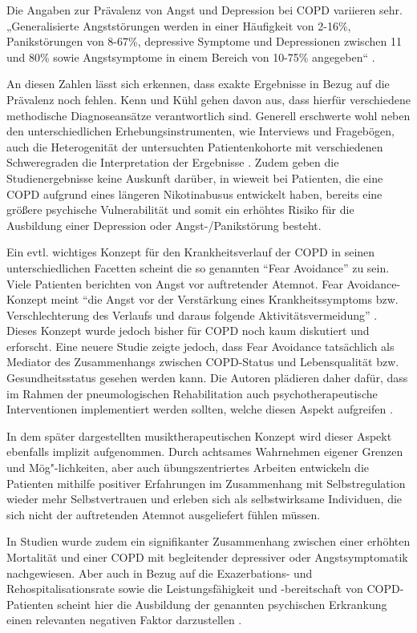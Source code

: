 Die Angaben zur Prävalenz von Angst und Depression bei COPD variieren sehr. „Generalisierte Angststörungen werden in einer Häufigkeit von 2-16\%, Panikstörungen von 8-67\%, depressive Symptome und Depressionen zwischen 11 und 80\% sowie Angstsymptome in einem Bereich von 10-75\% angegeben“  \autocite[34]{kenn2011}.

An diesen Zahlen lässt sich erkennen, dass exakte Ergebnisse in Bezug auf die Prävalenz noch fehlen. Kenn und Kühl gehen davon aus, dass hierfür verschiedene methodische Diagnoseansätze verantwortlich sind. Generell erschwerte wohl neben den unterschiedlichen Erhebungsinstrumenten, wie Interviews und Fragebögen, auch die Heterogenität der untersuchten Patientenkohorte mit verschiedenen Schweregraden die Interpretation der Ergebnisse \autocite[vgl.][35]{kenn2011}.
Zudem geben die Studienergebnisse keine Auskunft darüber, in wieweit bei Patienten, die eine COPD aufgrund eines längeren Nikotinabusus entwickelt haben, bereits eine größere psychische Vulnerabilität und somit ein erhöhtes Risiko für die Ausbildung einer Depression oder Angst-/Panikstörung besteht. 

Ein evtl. wichtiges Konzept für den Krankheitsverlauf der COPD in seinen unterschiedlichen Facetten scheint die so genannten "`Fear Avoidance"' zu sein. Viele Patienten berichten von Angst vor auftretender Atemnot. Fear Avoidance- Konzept meint "`die Angst vor der Verstärkung eines Krankheitssymptoms bzw. Verschlechterung des Verlaufs und daraus folgende Aktivitätsvermeidung"' \autocite[111]{stenzel2013}. Dieses Konzept wurde jedoch bisher für COPD noch kaum diskutiert und erforscht. Eine neuere Studie zeigte jedoch, dass Fear Avoidance tatsächlich als Mediator des Zusammenhangs zwischen COPD-Status und Lebensqualität bzw. Gesundheitsstatus gesehen werden kann. Die Autoren plädieren daher dafür, dass im Rahmen der pneumologischen Rehabilitation auch psychotherapeutische Interventionen implementiert werden sollten, welche diesen Aspekt aufgreifen \autocite[vgl.][112]{stenzel2013}. 

In dem später dargestellten musiktherapeutischen Konzept wird dieser Aspekt ebenfalls implizit aufgenommen. Durch achtsames Wahrnehmen eigener Grenzen und Mög"-lichkeiten, aber auch übungszentriertes Arbeiten entwickeln die Patienten mithilfe positiver Erfahrungen im Zusammenhang mit Selbstregulation wieder mehr Selbstvertrauen und erleben sich als selbstwirksame Individuen, die sich nicht der auftretenden Atemnot ausgeliefert fühlen müssen.

In Studien wurde zudem ein signifikanter Zusammenhang zwischen einer erhöhten Mortalität und einer COPD mit begleitender depressiver oder Angstsymptomatik nachgewiesen. Aber auch in Bezug auf die Exazerbations- und Rehospitalisationsrate sowie die Leistungsfähigkeit und -bereitschaft von COPD-Patienten scheint hier die Ausbildung der genannten psychischen Erkrankung einen relevanten negativen Faktor darzustellen \autocite[vgl.][]{kenn2011}.

